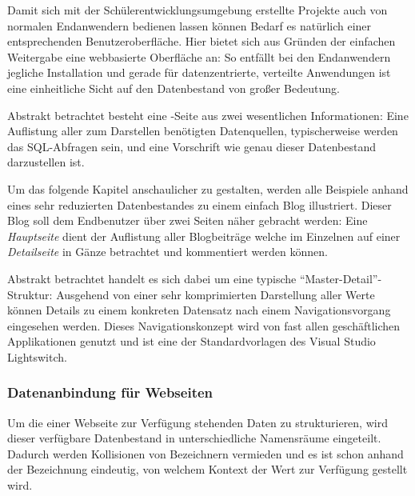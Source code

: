 
Damit sich mit der Schülerentwicklungsumgebung erstellte Projekte auch von normalen Endanwendern bedienen lassen können Bedarf es natürlich einer entsprechenden Benutzeroberfläche. Hier bietet sich aus Gründen der einfachen Weitergabe eine webbasierte Oberfläche an: So entfällt bei den Endanwendern jegliche Installation und gerade für datenzentrierte, verteilte Anwendungen ist eine einheitliche Sicht auf den Datenbestand von großer Bedeutung.

Abstrakt betrachtet besteht eine \idename-Seite aus zwei wesentlichen Informationen: Eine Auflistung aller zum Darstellen benötigten Datenquellen, typischerweise werden das SQL-Abfragen sein, und eine Vorschrift wie genau dieser Datenbestand darzustellen ist.

Um das folgende Kapitel anschaulicher zu gestalten, werden alle Beispiele anhand eines sehr reduzierten Datenbestandes zu einem einfach Blog illustriert. Dieser Blog soll dem Endbenutzer über zwei Seiten näher gebracht werden: Eine \textit{Hauptseite} dient der Auflistung aller Blogbeiträge welche im Einzelnen auf einer \textit{Detailseite} in Gänze betrachtet und kommentiert werden können.

Abstrakt betrachtet handelt es sich dabei um eine typische "`Master-Detail"'-Struktur: Ausgehend von einer sehr komprimierten Darstellung aller Werte können Details zu einem konkreten Datensatz nach einem Navigationsvorgang eingesehen werden. Dieses Navigationskonzept wird von fast allen geschäftlichen Applikationen genutzt und ist eine der Standardvorlagen des Visual Studio Lightswitch.


\subsubsection{Datenanbindung für Webseiten}

Um die einer Webseite zur Verfügung stehenden Daten zu strukturieren, wird dieser verfügbare Datenbestand in unterschiedliche Namensräume eingeteilt. Dadurch werden Kollisionen von Bezeichnern vermieden und es ist schon anhand der Bezeichnung eindeutig, von welchem Kontext der Wert zur Verfügung gestellt wird.

